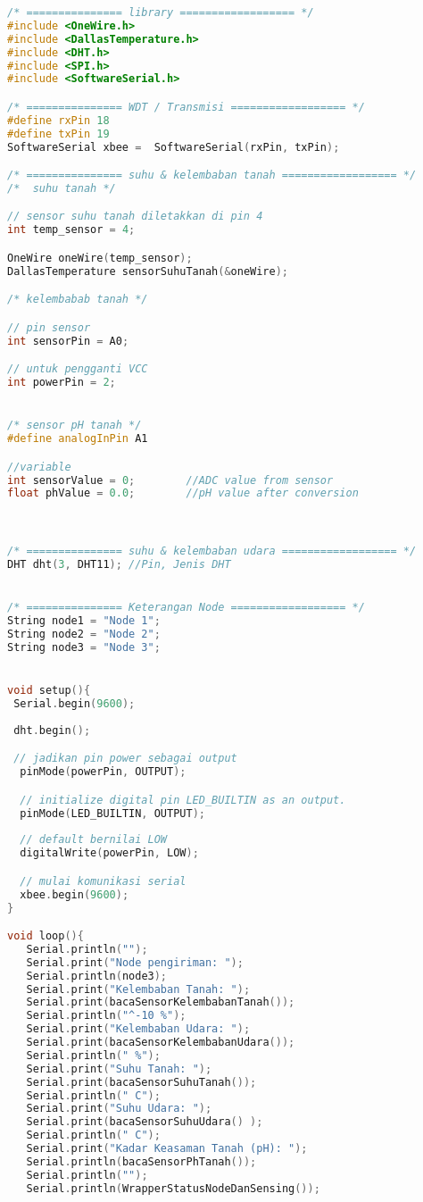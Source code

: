 \begin{lstlisting}[language=C++, caption=Node.ino]
/* =============== library ================== */
#include <OneWire.h>
#include <DallasTemperature.h>
#include <DHT.h> 
#include <SPI.h>
#include <SoftwareSerial.h>

/* =============== WDT / Transmisi ================== */
#define rxPin 18
#define txPin 19
SoftwareSerial xbee =  SoftwareSerial(rxPin, txPin);

/* =============== suhu & kelembaban tanah ================== */
/*  suhu tanah */

// sensor suhu tanah diletakkan di pin 4
int temp_sensor = 4; 

OneWire oneWire(temp_sensor); 
DallasTemperature sensorSuhuTanah(&oneWire);

/* kelembabab tanah */

// pin sensor
int sensorPin = A0;  

// untuk pengganti VCC
int powerPin = 2;    


/* sensor pH tanah */
#define analogInPin A1  

//variable
int sensorValue = 0;        //ADC value from sensor
float phValue = 0.0;        //pH value after conversion



/* =============== suhu & kelembaban udara ================== */
DHT dht(3, DHT11); //Pin, Jenis DHT


/* =============== Keterangan Node ================== */
String node1 = "Node 1";
String node2 = "Node 2";
String node3 = "Node 3";


void setup(){
 Serial.begin(9600);
 
 dht.begin();

 // jadikan pin power sebagai output
  pinMode(powerPin, OUTPUT);

  // initialize digital pin LED_BUILTIN as an output.
  pinMode(LED_BUILTIN, OUTPUT);
   
  // default bernilai LOW
  digitalWrite(powerPin, LOW);

  // mulai komunikasi serial
  xbee.begin(9600);
}

void loop(){
   Serial.println("");
   Serial.print("Node pengiriman: ");
   Serial.println(node3);
   Serial.print("Kelembaban Tanah: "); 
   Serial.print(bacaSensorKelembabanTanah());
   Serial.println("^-10 %");
   Serial.print("Kelembaban Udara: ");
   Serial.print(bacaSensorKelembabanUdara());
   Serial.println(" %");
   Serial.print("Suhu Tanah: ");
   Serial.print(bacaSensorSuhuTanah());
   Serial.println(" C");
   Serial.print("Suhu Udara: ");
   Serial.print(bacaSensorSuhuUdara() );
   Serial.println(" C");
   Serial.print("Kadar Keasaman Tanah (pH): ");
   Serial.println(bacaSensorPhTanah());
   Serial.println("");
   Serial.println(WrapperStatusNodeDanSensing());


\end{lstlisting}
